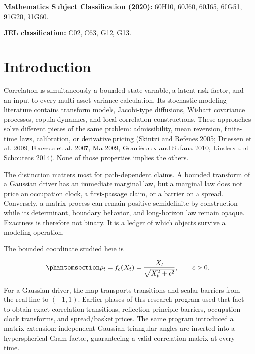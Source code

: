 \documentclass[
  english,
  11pt,
  letterpaper,
  DIV=11,
  numbers=noendperiod]{scrartcl}
\renewcommand*\contentsname{Table of contents}
\newcommand\contentsname{Table of contents}
\theoremstyle{plain}
\theoremstyle{plain}
\theoremstyle{plain}
\theoremstyle{plain}
\theoremstyle{remark}
\begin{document}
\renewcommand*\contentsname{Table of contents}
{
\setcounter{tocdepth}{2}
\tableofcontents
}

\textbf{Mathematics Subject Classification (2020):} 60H10, 60J60, 60J65,
60G51, 91G20, 91G60.

\textbf{JEL classification:} C02, C63, G12, G13.

\section{Introduction}\label{sec-introduction}

Correlation is simultaneously a bounded state variable, a latent risk
factor, and an input to every multi-asset variance calculation. Its
stochastic modeling literature contains transform models, Jacobi-type
diffusions, Wishart covariance processes, copula dynamics, and
local-correlation constructions. These approaches solve different pieces
of the same problem: admissibility, mean reversion, finite-time laws,
calibration, or derivative pricing (Skintzi and Refenes 2005; Driessen
et al. 2009; Fonseca et al. 2007; Ma 2009; Gouriéroux and Sufana 2010;
Linders and Schoutens 2014). None of those properties implies the
others.

The distinction matters most for path-dependent claims. A bounded
transform of a Gaussian driver has an immediate marginal law, but a
marginal law does not price an occupation clock, a first-passage claim,
or a barrier on a spread. Conversely, a matrix process can remain
positive semidefinite by construction while its determinant, boundary
behavior, and long-horizon law remain opaque. Exactness is therefore not
binary. It is a ledger of which objects survive a modeling operation.

The bounded coordinate studied here is

\begin{equation}\protect\phantomsection\label{eq-bounded-map}{
\rho_t=f_c(X_t)
=\frac{X_t}{\sqrt{X_t^2+c^2}},
\qquad
c>0.
}\end{equation}

For a Gaussian driver, the map transports transitions and scalar
barriers from the real line to \((-1,1)\). Earlier phases of this
research program used that fact to obtain exact correlation transitions,
reflection-principle barriers, occupation-clock transforms, and
spread/basket prices. The same program introduced a matrix extension:
independent Gaussian triangular angles are inserted into a
hyperspherical Gram factor, guaranteeing a valid correlation matrix at
every time.
\end{document}
